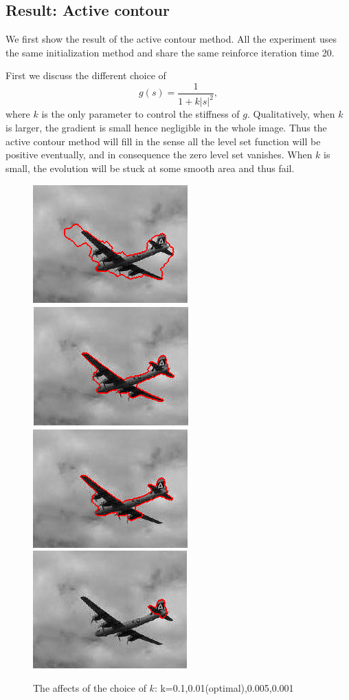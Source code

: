 \documentclass{article}
\begin{document}
\subsection{Result: Active contour}
We first show the result of the active contour method.  All the experiment uses the same initialization method and share the same reinforce iteration time 20. 

First we discuss the different choice of $$g(s) = \frac{1}{1+k|s|^2},$$
where $k$ is the only parameter to control the stiffness of $g$. Qualitatively, when $k$ is larger, the gradient is small hence negligible in the whole image. Thus the active contour method will fill in the sense all the level set function will be positive eventually, and in consequence the zero level set vanishes. When $k$ is small, the evolution will be stuck at some smooth area and thus fail. 

\begin{figure}[H]
\caption{The affects of the choice of $k$: k=0.1,0.01(optimal),0.005,0.001}
\begin{center}
\includegraphics[scale=.7]{k1.png}
\includegraphics[scale=.7]{k01.png}
\includegraphics[scale=.7]{k005.png}
\includegraphics[scale=.7]{k001.png}
\end{center}
\end{figure}
\end{document}
